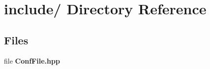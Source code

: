 \section{include/ Directory Reference}
\label{dir_000000}
\subsection*{Files}
\begin{CompactItemize}
\item 
file {\bf ConfFile.hpp}
\end{CompactItemize}
